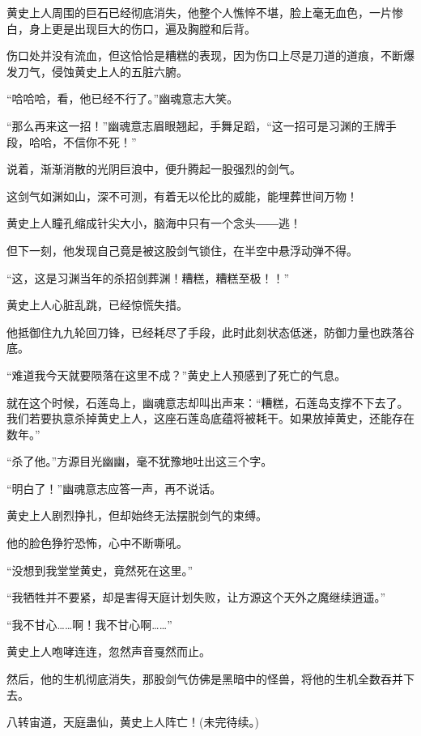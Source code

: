 \begin{this_body}
黄史上人周围的巨石已经彻底消失，他整个人憔悴不堪，脸上毫无血色，一片惨白，身上更是出现巨大的伤口，遍及胸膛和后背。

伤口处并没有流血，但这恰恰是糟糕的表现，因为伤口上尽是刀道的道痕，不断爆发刀气，侵蚀黄史上人的五脏六腑。

“哈哈哈，看，他已经不行了。”幽魂意志大笑。

“那么再来这一招！”幽魂意志眉眼翘起，手舞足蹈，“这一招可是习渊的王牌手段，哈哈，不信你不死！”

说着，渐渐消散的光阴巨浪中，便升腾起一股强烈的剑气。

这剑气如渊如山，深不可测，有着无以伦比的威能，能埋葬世间万物！

黄史上人瞳孔缩成针尖大小，脑海中只有一个念头――逃！

但下一刻，他发现自己竟是被这股剑气锁住，在半空中悬浮动弹不得。

“这，这是习渊当年的杀招剑葬渊！糟糕，糟糕至极！！”

黄史上人心脏乱跳，已经惊慌失措。

他抵御住九九轮回刀锋，已经耗尽了手段，此时此刻状态低迷，防御力量也跌落谷底。

“难道我今天就要陨落在这里不成？”黄史上人预感到了死亡的气息。

就在这个时候，石莲岛上，幽魂意志却叫出声来：“糟糕，石莲岛支撑不下去了。我们若要执意杀掉黄史上人，这座石莲岛底蕴将被耗干。如果放掉黄史，还能存在数年。”

“杀了他。”方源目光幽幽，毫不犹豫地吐出这三个字。

“明白了！”幽魂意志应答一声，再不说话。

黄史上人剧烈挣扎，但却始终无法摆脱剑气的束缚。

他的脸色狰狞恐怖，心中不断嘶吼。

“没想到我堂堂黄史，竟然死在这里。”

“我牺牲并不要紧，却是害得天庭计划失败，让方源这个天外之魔继续逍遥。”

“我不甘心……啊！我不甘心啊……”

黄史上人咆哮连连，忽然声音戛然而止。

然后，他的生机彻底消失，那股剑气仿佛是黑暗中的怪兽，将他的生机全数吞并下去。

八转宙道，天庭蛊仙，黄史上人阵亡！(未完待续。)

\end{this_body}

